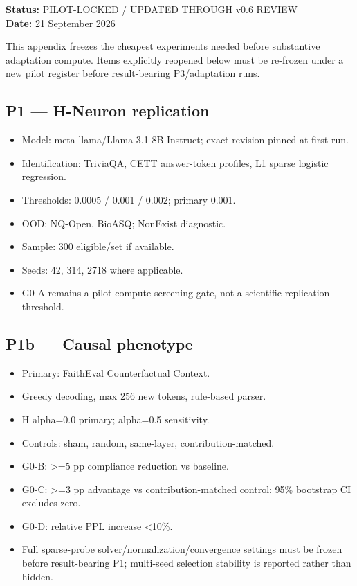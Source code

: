 \textbf{Status:} PILOT-LOCKED / UPDATED THROUGH v0.6 REVIEW\\
\textbf{Date:} 21 September 2026

This appendix freezes the cheapest experiments needed before substantive adaptation compute. Items explicitly reopened below must be re-frozen under a new pilot register before result-bearing P3/adaptation runs.

\subsection{P1 --- H-Neuron replication}\label{p1-h-neuron-replication}

\begin{itemize}
\tightlist
\item Model: meta-llama/Llama-3.1-8B-Instruct; exact revision pinned at first run.
\item Identification: TriviaQA, CETT answer-token profiles, L1 sparse logistic regression.
\item Thresholds: 0.0005 / 0.001 / 0.002; primary 0.001.
\item OOD: NQ-Open, BioASQ; NonExist diagnostic.
\item Sample: 300 eligible/set if available.
\item Seeds: 42, 314, 2718 where applicable.
\item G0-A remains a pilot compute-screening gate, not a scientific replication threshold.
\end{itemize}

\subsection{P1b --- Causal phenotype}\label{p1b-causal-phenotype}

\begin{itemize}
\tightlist
\item Primary: FaithEval Counterfactual Context.
\item Greedy decoding, max 256 new tokens, rule-based parser.
\item H alpha=0.0 primary; alpha=0.5 sensitivity.
\item Controls: sham, random, same-layer, contribution-matched.
\item G0-B: >=5 pp compliance reduction vs baseline.
\item G0-C: >=3 pp advantage vs contribution-matched control; 95\% bootstrap CI excludes zero.
\item G0-D: relative PPL increase <10\%.
\item Full sparse-probe solver/normalization/convergence settings must be frozen before result-bearing P1; multi-seed selection stability is reported rather than hidden.
\end{itemize}

